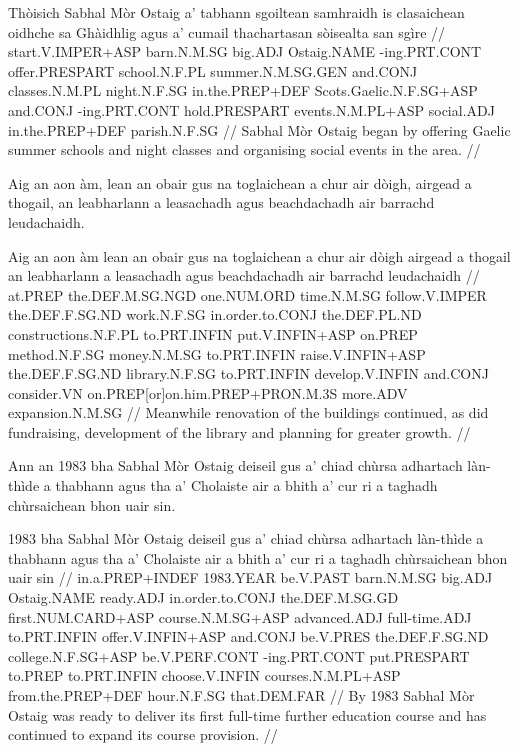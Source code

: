 \documentclass[a4paper,10pt]{article}
\begin{document}
\vspace{4mm}
\gla Thòisich Sabhal Mòr Ostaig a' tabhann sgoiltean samhraidh is clasaichean oidhche sa Ghàidhlig agus a' cumail thachartasan sòisealta san sgìre  //
\glb start.V.IMPER+ASP barn.N.M.SG big.ADJ Ostaig.NAME -ing.PRT.CONT offer.PRESPART school.N.F.PL summer.N.M.SG.GEN and.CONJ classes.N.M.PL night.N.F.SG in.the.PREP+DEF Scots.Gaelic.N.F.SG+ASP and.CONJ -ing.PRT.CONT hold.PRESPART events.N.M.PL+ASP social.ADJ in.the.PREP+DEF parish.N.F.SG  //
\glft Sabhal Mòr Ostaig began by offering Gaelic summer schools and night classes and organising social events in the area. //
\endgl
\xe

\ex
\begingl
\glpre Aig an aon àm, lean an obair gus na toglaichean a chur air dòigh, airgead a thogail, an leabharlann a leasachadh agus beachdachadh air barrachd leudachaidh. 

\vspace{4mm}
\gla Aig an aon àm lean an obair gus na toglaichean a chur air dòigh airgead a thogail an leabharlann a leasachadh agus beachdachadh air barrachd leudachaidh  //
\glb at.PREP the.DEF.M.SG.NGD one.NUM.ORD time.N.M.SG follow.V.IMPER the.DEF.F.SG.ND work.N.F.SG in.order.to.CONJ the.DEF.PL.ND constructions.N.F.PL to.PRT.INFIN put.V.INFIN+ASP on.PREP method.N.F.SG money.N.M.SG to.PRT.INFIN raise.V.INFIN+ASP the.DEF.F.SG.ND library.N.F.SG to.PRT.INFIN develop.V.INFIN and.CONJ consider.VN on.PREP[or]on.him.PREP+PRON.M.3S more.ADV expansion.N.M.SG  //
\glft Meanwhile renovation of the buildings continued, as did fundraising, development of the library and planning for greater growth. //
\endgl
\xe

\ex
\begingl
\glpre Ann an 1983 bha Sabhal Mòr Ostaig deiseil gus a' chiad chùrsa adhartach làn-thìde a thabhann agus tha a' Cholaiste air a bhith a' cur ri a taghadh chùrsaichean bhon uair sin. 

\vspace{4mm}
 1983 bha Sabhal Mòr Ostaig deiseil gus a' chiad chùrsa adhartach làn-thìde a thabhann agus tha a' Cholaiste {air a bhith} a' cur ri a taghadh chùrsaichean bhon uair sin  //
\glb in.a.PREP+INDEF 1983.YEAR be.V.PAST barn.N.M.SG big.ADJ Ostaig.NAME ready.ADJ in.order.to.CONJ the.DEF.M.SG.GD first.NUM.CARD+ASP course.N.M.SG+ASP advanced.ADJ full-time.ADJ to.PRT.INFIN offer.V.INFIN+ASP and.CONJ be.V.PRES the.DEF.F.SG.ND college.N.F.SG+ASP be.V.PERF.CONT -ing.PRT.CONT put.PRESPART to.PREP to.PRT.INFIN choose.V.INFIN courses.N.M.PL+ASP from.the.PREP+DEF hour.N.F.SG that.DEM.FAR  //
\glft By 1983 Sabhal Mòr Ostaig was ready to deliver its first full-time further education course and has continued to expand its course provision. //
\endgl
\xe
\end{document}
